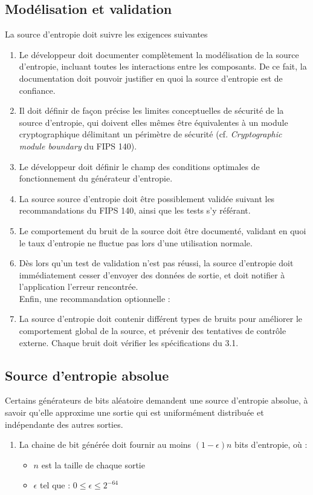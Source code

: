 \subsection{Modélisation et validation}
La source d'entropie doit suivre les exigences suivantes 
\begin{enumerate}
\item Le développeur doit documenter complètement la modélisation de la source d'entropie, incluant toutes les interactions entre les composants. De ce fait, la documentation doit pouvoir justifier en quoi la source d'entropie est de confiance. 
\item Il doit définir de façon précise les limites conceptuelles de sécurité de la source d'entropie, qui doivent elles mêmes être équivalentes à un module cryptographique délimitant un périmètre de sécurité (cf. \textit{Cryptographic module boundary} du FIPS 140).
\item Le développeur doit définir le champ des conditions optimales de fonctionnement du générateur d'entropie.
\item La source source d'entropie doit être possiblement validée suivant les recommandations du FIPS 140, ainsi que les tests s'y référant.
\item Le comportement du bruit de la source doit être documenté, validant en quoi le taux d'entropie ne fluctue pas lors d'une utilisation normale.
\item Dès lors qu'un test de validation n'est pas réussi, la source d'entropie doit immédiatement cesser d'envoyer des données de sortie, et doit notifier à l'application l'erreur rencontrée.\\

Enfin, une recommandation optionnelle : 
\item La source d'entropie doit contenir différent types de bruits pour améliorer le comportement global de la source, et prévenir des tentatives de contrôle externe. Chaque bruit doit vérifier les spécifications du 3.1. 
\end{enumerate}

\subsection{Source d'entropie absolue}
Certains générateurs de bits aléatoire demandent une source d'entropie absolue, à savoir qu'elle approxime une sortie qui est uniformément distribuée et indépendante des autres sorties. 
\begin{enumerate}
\item La chaine de bit générée doit fournir au moins $(1-\epsilon)n$ bits d'entropie, où : 
	\begin{itemize}
	\item $n$ est la taille de chaque sortie
	\item $\epsilon$ tel que : $0\leqslant \epsilon \leqslant 2^{-64}$
	\end{itemize}
\end{enumerate}

